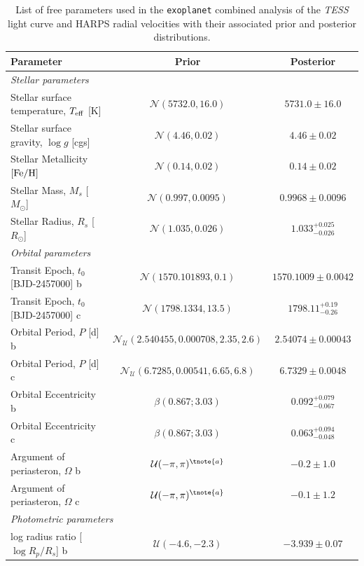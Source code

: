 \documentclass[fleqn,usenatbib]{mnras}
\newcommand{\tess}{{\it TESS}}
\newcommand{\harps}{{HARPS}}
\newcommand{\teff}{$T_{\rm eff}$}
\newcommand{\feh}{\mbox{$\rm [Fe/H]$}}
\newcommand{\logg}{$\log g$}
\begin{document}
\onecolumn
\centering
\begin{table}
\caption{List of free parameters used in the \texttt{exoplanet} combined analysis of the \tess{} light curve and \harps{} radial velocities with their associated prior and posterior distributions.}
\label{tab:plantparlong}
\begin{center}
\begin{tabular}{lcc}
\hline
\hline
Parameter & Prior & Posterior\\
\hline
\hline
\multicolumn{3}{l}{\it Stellar parameters}\\
Stellar surface temperature, \teff{} [K] &  $\mathcal{N}(5732.0,16.0)$  &   $ 5731.0 \pm 16.0 $ \\
Stellar surface gravity, \logg{} [cgs] &  $\mathcal{N}(4.46,0.02)$  &   $ 4.46 \pm 0.02 $ \\
Stellar Metallicity \feh{} &  $\mathcal{N}(0.14,0.02)$  &   $ 0.14 \pm 0.02 $ \\
Stellar Mass, $M_s$ [$M_{\odot}$] &  $\mathcal{N}(0.997,0.0095)$  &   $ 0.9968 \pm 0.0096 $ \\
Stellar Radius, $R_s$ [$R_{\odot}$] &  $\mathcal{N}(1.035,0.026)$  &   $ 1.033^{+0.025}_{-0.026} $ \\
\hline
\multicolumn{3}{l}{\it Orbital parameters}\\
Transit Epoch, $t_0$ [BJD-2457000] b &  $\mathcal{N}(1570.101893,0.1)$  &   $ 1570.1009 \pm 0.0042 $ \\
Transit Epoch, $t_0$ [BJD-2457000] c &  $\mathcal{N}(1798.1334,13.5)$  &   $ 1798.11^{+0.19}_{-0.26} $ \\
Orbital Period, $P$ [d] b &  $\mathcal{N}_{\mathcal{U}}(2.540455,0.000708,2.35,2.6)$  &   $ 2.54074 \pm 0.00043 $ \\
Orbital Period, $P$ [d] c &  $\mathcal{N}_{\mathcal{U}}(6.7285,0.00541,6.65,6.8)$  &   $ 6.7329 \pm 0.0048 $ \\
Orbital Eccentricity b &  $\beta(0.867;3.03)$  &   $ 0.092^{+0.079}_{-0.067} $ \\
Orbital Eccentricity c &  $\beta(0.867;3.03)$  &   $ 0.063^{+0.094}_{-0.048} $ \\
Argument of periasteron, $\Omega$ b &  $\mathcal{U}(-\pi,\pi)^{\tnote{a}}$  &   $ -0.2 \pm 1.0 $ \\
Argument of periasteron, $\Omega$ c &  $\mathcal{U}(-\pi,\pi)^{\tnote{a}}$  &   $ -0.1 \pm 1.2 $ \\
\hline
\multicolumn{3}{l}{\it Photometric parameters}\\
log radius ratio [$\log{R_p/R_s}$] b &  $\mathcal{U}(-4.6,-2.3)$  &   $ -3.939 \pm 0.07 $ \\

\end{tabular}
\end{center}
\end{table}
\end{document}
